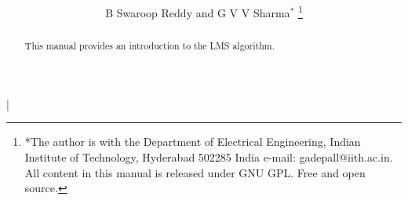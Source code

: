 |\documentclass[journal,12pt,twocolumn]{IEEEtran}
\renewcommand\thesection{\arabic{section}}
\begin{document}
\let\StandardTheFigure\thefigure
\renewcommand{\thefigure}{\thesection}



\makeatletter
{}
\makeatother

\let\StandardTheFigure\thefigure
\let\StandardTheTable\thetable





\def\putbox#1#2#3{\makebox[0in][l]{\makebox[#1][l]{}\raisebox{\baselineskip}[0in][0in]{\raisebox{#2}[0in][0in]{#3}}}}
     \def\rightbox#1{\makebox[0in][r]{#1}}
     \def\centbox#1{\makebox[0in]{#1}}
     \def\topbox#1{\raisebox{-\baselineskip}[0in][0in]{#1}}
     \def\midbox#1{\raisebox{-0.5\baselineskip}[0in][0in]{#1}}

\vspace{3cm}

\title{ 
}

\author{B Swaroop Reddy and G V V Sharma$^{*}$%
	\thanks{*The author is with the Department
		of Electrical Engineering, Indian Institute of Technology, Hyderabad
		502285 India e-mail:  gadepall@iith.ac.in. All content in this manual is released under GNU GPL.  Free and open source.}
	
}	

\maketitle

\tableofcontents

\bigskip

\renewcommand{\thefigure}{\theenumi}
\renewcommand{\thetable}{\theenumi}


\begin{abstract}
	
This manual provides an introduction to the LMS algorithm.
		
\end{abstract}
\end{document}
